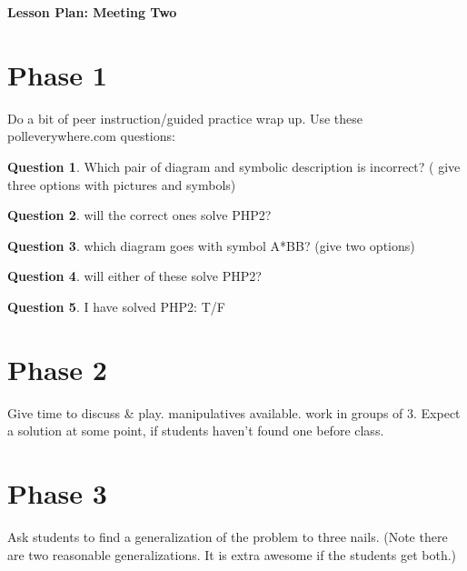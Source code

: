 \documentclass[12pt]{amsart}
\theoremstyle{definition}
\newtheorem{question}{Question}
\begin{document}
\begin{center}
\textbf{\Huge
Lesson Plan: Meeting Two
}
\end{center}
\vspace{.5in}

\section{Phase 1}
Do a bit of peer instruction/guided practice wrap up. 
Use these polleverywhere.com questions:

\begin{question}
 Which pair of diagram and symbolic description is incorrect?  ( give three options with pictures and symbols)
\end{question}

\begin{question} will the correct ones solve PHP2?
\end{question}

\begin{question} 
which diagram goes with symbol A*BB? (give two options)
\end{question}

\begin{question} 
will either of these solve PHP2?
\end{question}

\begin{question}
I have solved PHP2:  T/F
\end{question}

\section{Phase 2} 
Give time to discuss \& play. manipulatives available. work in groups of 3. Expect a solution at some point, if students haven't found one before class.

\section{Phase 3}
Ask students to find a generalization of the problem to three nails. (Note there are two reasonable generalizations. It is extra awesome if the students get both.)
\end{document}
